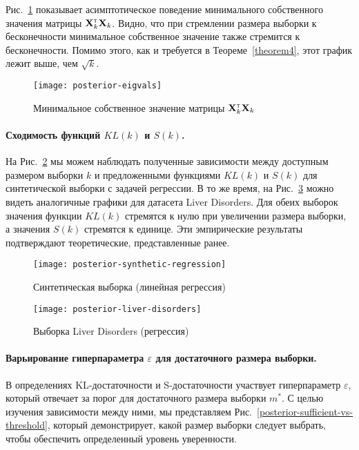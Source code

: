 Рис.~\ref{posterior-eigvals} показывает асимптотическое поведение минимального собственного значения матрицы $\mathbf{X}_k^{\text{\tiny\sffamily\upshape\mdseries T}} \mathbf{X}_k$. Видно, что при стремлении размера выборки к бесконечности минимальное собственное значение также стремится к бесконечности. Помимо этого, как и требуется в Теореме~\ref{theorem4}, этот график лежит выше, чем $\sqrt{k}$.

\begin{figure}[h!]
    \centering
    \texttt{[image: posterior-eigvals]}
    \caption{Минимальное собственное значение матрицы $\mathbf{X}_k^{\text{\tiny\sffamily\upshape\mdseries T}} \mathbf{X}_k$}
    \label{posterior-eigvals}
\end{figure}

\paragraph{Сходимость функций $KL(k)$ и $S(k)$.}

На Рис.~\ref{posterior-synthetic-regression} мы можем наблюдать полученные зависимости между доступным размером выборки $k$ и предложенными функциями $KL(k)$ и $S(k)$ для синтетической выборки с задачей регрессии. В то же время, на Рис.~\ref{posterior-liver-disorders} можно видеть аналогичные графики для датасета Liver Disorders. Для обеих выборок значения функции $KL(k)$ стремятся к нулю при увеличении размера выборки, а значения $S(k)$ стремятся к единице. Эти эмпирические результаты подтверждают теоретические, представленные ранее.

\begin{figure}[h!]
    \centering
    \texttt{[image: posterior-synthetic-regression]}
    \caption{Синтетическая выборка (линейная регрессия)}
    \label{posterior-synthetic-regression}
\end{figure}

\begin{figure}[h!]
    \centering
    \texttt{[image: posterior-liver-disorders]}
    \caption{Выборка Liver Disorders (регрессия)}
    \label{posterior-liver-disorders}
\end{figure}

\paragraph{Варьирование гиперпараметра $\varepsilon$ для достаточного размера выборки.}

В определениях KL-достаточности и S-достаточности участвует гиперпараметр $\varepsilon$, который отвечает за порог для достаточного размера выборки $m^*$. С целью изучения зависимости между ними, мы представляем Рис.~\ref{posterior-sufficient-vs-threshold}, который демонстрирует, какой размер выборки следует выбрать, чтобы обеспечить определенный уровень уверенности.

